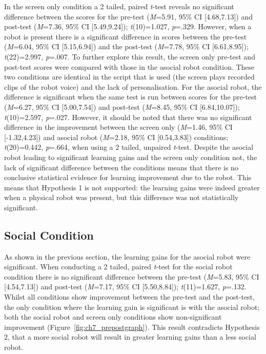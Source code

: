 In the screen only condition a 2 tailed, paired \textit{t}-test reveals no significant difference between the scores for the pre-test (\textit{M}=5.91, 95\% CI [4.68,7.13]) and post-test (\textit{M}=7.36, 95\% CI [5.49,9.24]); \textit{t}(10)=1.027, \textit{p}=.329. However, when a robot is present there is a significant difference in scores between the pre-test (\textit{M}=6.04, 95\% CI [5.15,6.94]) and the post-test (\textit{M}=7.78, 95\% CI [6.61,8.95]); \textit{t}(22)=2.997, \textit{p}=.007. To further explore this result, the screen only pre-test and post-test scores were compared with those in the asocial robot condition. These two conditions are identical in the script that is used (the screen plays recorded clips of the robot voice) and the lack of personalisation. For the asocial robot, the difference is significant when the same test is run between scores for the pre-test (\textit{M}=6.27, 95\% CI [5.00,7.54]) and post-test (\textit{M}=8.45, 95\% CI [6.84,10.07]); \textit{t}(10)=2.597, \textit{p}=.027. However, it should be noted that there was no significant difference in the improvement between the screen only (\textit{M}=1.46, 95\% CI [-1.32,4.23]) and asocial robot (\textit{M}=2.18, 95\% CI [0.54,3.83]) conditions; \textit{t}(20)=0.442, \textit{p}=.664, when using a 2 tailed, unpaired \textit{t}-test. Despite the asocial robot leading to significant learning gains and the screen only condition not, the lack of significant difference between the conditions means that there is no conclusive statistical evidence for learning improvement due to the robot. This means that Hypothesis 1 is not supported: the learning gains were indeed greater when a physical robot was present, but this difference was not statistically significant.

\subsection{Social Condition}\label{sec:socasoc-results-social}
As shown in the previous section, the \gls{learning} gains for the asocial robot were significant. When conducting a 2 tailed, paired \textit{t}-test for the social robot condition there is no significant difference between the pre-test (\textit{M}=5.83, 95\% CI [4.54,7.13]) and post-test (\textit{M}=7.17, 95\% CI [5.50,8.84]); \textit{t}(11)=1.627, \textit{p}=.132. Whilst all conditions show improvement between the pre-test and the post-test, the only condition where the \gls{learning} gain is significant is with the asocial robot; both the social robot and screen only conditions show non-significant improvement (Figure~\ref{fig:ch7_prepostgraph}). This result contradicts Hypothesis 2, that a more social robot will result in greater \gls{learning} gains than a less social robot.

